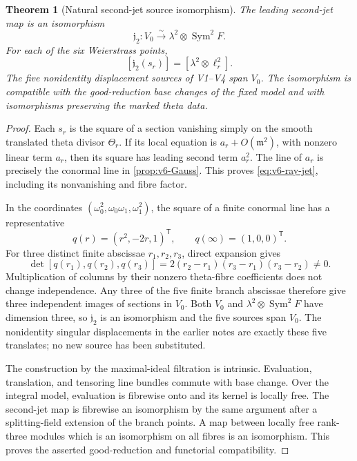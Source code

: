 \documentclass[11pt]{article}
\newtheorem{theorem}{Theorem}[section]
\theoremstyle{definition}
\theoremstyle{remark}
\begin{document}
\begin{theorem}[Natural second-jet source isomorphism]
\label{thm:v6-jet-isomorphism}
The leading second-jet map is an isomorphism
\begin{equation}
 \boxed{\mathfrak j_2:V_0\xrightarrow{\sim}\lambda^2\otimes\operatorname{Sym}^2F.}
 \label{eq:v6-jet-iso}
\end{equation}
For each of the six Weierstrass points,
\begin{equation}
 \boxed{[\mathfrak j_2(s_r)]=[\lambda^2\otimes\ell_r^2].}
 \label{eq:v6-ray-jet}
\end{equation}
The five nonidentity displacement sources of V1--V4 span $V_0$.
The isomorphism is compatible with the good-reduction base changes of
the fixed model and with isomorphisms preserving the marked theta data.
\end{theorem}
\begin{proof}
Each $s_r$ is the square of a section vanishing simply on the smooth
translated theta divisor $\Theta_r$. If its local equation is
$a_r+O(\mathfrak m^2)$, with nonzero linear term $a_r$, then its square
has leading second term $a_r^2$. The line of $a_r$ is precisely the
conormal line in \cref{prop:v6-Gauss}. This proves
\eqref{eq:v6-ray-jet}, including its nonvanishing and fibre factor.

In the coordinates $(\omega_0^2,\omega_0\omega_1,\omega_1^2)$, the
square of a finite conormal line has a representative
\[
 q(r)=(r^2,-2r,1)^{\mathsf T},\qquad
 q(\infty)=(1,0,0)^{\mathsf T}.
\]
For three distinct finite abscissae $r_1,r_2,r_3$, direct expansion gives
\begin{equation}
 \det[q(r_1),q(r_2),q(r_3)]
 =2(r_2-r_1)(r_3-r_1)(r_3-r_2)\ne0.
 \label{eq:v6-Veronese-det}
\end{equation}
Multiplication of columns by their nonzero theta-fibre coefficients does
not change independence. Any three of the five finite branch abscissae
therefore give three independent images of sections in $V_0$.
Both $V_0$ and $\lambda^2\otimes\operatorname{Sym}^2F$ have dimension
three, so $\mathfrak j_2$ is an isomorphism and the five sources span $V_0$.
The nonidentity singular displacements in the earlier notes are exactly
these five translates; no new source has been substituted.

The construction by the maximal-ideal filtration is intrinsic. Evaluation,
translation, and tensoring line bundles commute with base change.
Over the integral model, evaluation is fibrewise onto and its kernel is
locally free. The second-jet map is fibrewise an isomorphism by the same
argument after a splitting-field extension of the branch points. A map
between locally free rank-three modules which is an isomorphism on all
fibres is an isomorphism. This proves the asserted good-reduction and
functorial compatibility.
\end{proof}
\end{document}
